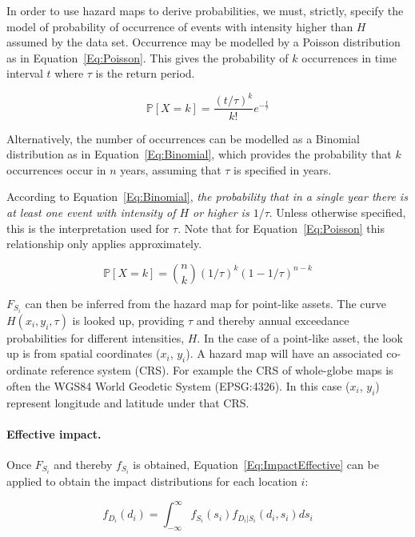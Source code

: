 \documentclass[a4paper,11pt]{extarticle} %
\begin{document}
In order to use hazard maps to derive probabilities, we must, strictly, specify the model of probability of occurrence of events with intensity higher than $H$ assumed by the data set. Occurrence may be modelled by a Poisson distribution as in Equation~\ref{Eq:Poisson}. This gives the probability of $k$ occurrences in time interval $t$ where $\tau$ is the return period.

 \begin{equation}
	\label{Eq:Poisson}
	\mathbb{P}[X = k] = \frac{(t / \tau)^k}{k!}  e^{-\frac{t}{\tau}}
\end{equation}

Alternatively, the number of occurrences can be modelled as a Binomial distribution as in Equation~\ref{Eq:Binomial}, which provides the probability that $k$ occurrences occur in $n$ years, assuming that $\tau$ is specified in years.  

According to Equation~\ref{Eq:Binomial}, \emph{the probability that in a single year there is at least one event with intensity of $H$ or higher is $1/\tau$}. Unless otherwise specified, this is the interpretation used for $\tau$. Note that for Equation~\ref{Eq:Poisson} this relationship only applies approximately.

 \begin{equation}
	\label{Eq:Binomial}
	\mathbb{P}[X = k] = \binom{n}{k} (1/\tau)^k (1-1/\tau)^{n - k}
\end{equation}

$F_{S_i}$ can then be inferred from the hazard map for point-like assets. The curve $H(x_i, y_i, \tau)$ is looked up, providing $\tau$ and thereby annual exceedance probabilities for different intensities, $H$. In the case of a point-like asset, the look up is from spatial coordinates ($x_i$, $y_i$). A hazard map will have an associated co-ordinate reference system (CRS). For example the CRS of whole-globe maps is often the WGS84 World Geodetic System (EPSG:4326). In this case ($x_i$, $y_i$) represent longitude and latitude under that CRS. 

\paragraph{Effective impact.} Once $F_{S_i}$ and thereby $f_{S_i}$ is obtained, Equation~\ref{Eq:ImpactEffective} can be applied to obtain the impact distributions for each location $i$:

 \begin{equation}
	\label{Eq:ImpactMarginal2}
	f_{D_i}(d_i) = \int_{-\infty}^{\infty} f_{S_i}(s_i) f_{D_i|S_i}(d_i, s_i) ds_i
\end{equation}
\end{document}
